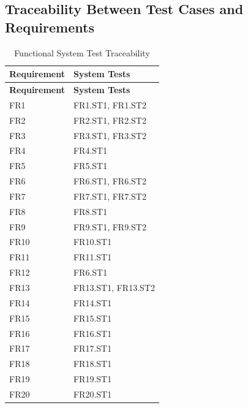 \documentclass[12pt, titlepage]{article}
\begin{document}
\subsection{Traceability Between Test Cases and Requirements}

\begin{longtable}[H]{|p{} | p{}|}
  \caption{Functional System Test Traceability}
  \label{TblFRSTTraceability}\\
  \hline
  \textbf{Requirement} & \textbf{System Tests}\\
  \hline
  \endfirsthead
  \hline
  \textbf{Requirement} & \textbf{System Tests}\\
  \hline
  \endhead
  FR1 & FR1.ST1, FR1.ST2\\
  \hline
  FR2 & FR2.ST1, FR2.ST2\\
  \hline
  FR3 & FR3.ST1, FR3.ST2\\
  \hline
  FR4 & FR4.ST1\\
  \hline
  FR5 & FR5.ST1\\
  \hline
  FR6 & FR6.ST1, FR6.ST2\\
  \hline
  FR7 & FR7.ST1, FR7.ST2\\
  \hline
  FR8 & FR8.ST1\\
  \hline
  FR9 & FR9.ST1, FR9.ST2\\
  \hline
  FR10 & FR10.ST1\\
  \hline
  FR11 & FR11.ST1\\
  \hline
  FR12 & FR6.ST1\\
  \hline
  FR13 & FR13.ST1, FR13.ST2\\
  \hline
  FR14 & FR14.ST1\\
  \hline
  FR15 & FR15.ST1\\
  \hline
  FR16 & FR16.ST1\\
  \hline
  FR17 & FR17.ST1\\
  \hline
  FR18 & FR18.ST1\\
  \hline
  FR19 & FR19.ST1\\
  \hline
  FR20 & FR20.ST1\\
  \hline
\end{longtable}
\end{document}
